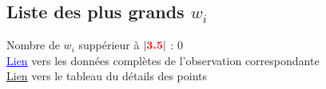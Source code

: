 \documentclass[a4paper, 9pt]{report}
\newenvironment{smalllongtable}{%
    \scriptsize %
    \ttfamily
    \begin{longtable}%
    }{
    \end{longtable}%
    }
\begin{document}
                \newpage
                            \begin{landscape}
                            \subsection{Liste des plus grands $w_i$}
                            \hypertarget{tableau_plusG_wi}{}
                            Nombre de $w_i$ suppérieur à $|\textbf{\textcolor{red}{3.5}}|$ : 0\\
                            \hyperlink{tableau_obs}{\textcolor{blue}{\underline{Lien}}} vers les données complètes de l'observation correspondante\\
                            \hyperlink{tableau_details_points}{Lien} vers le tableau du détails des points\\
                            \vspace{8pt}
                    
                                \begin{smalllongtable}{     
                                >{\raggedright}m{}%
                                >{\raggedright}m{1.5cm}%
                                >{\raggedleft}m{2.4cm}%
                                >{\raggedleft}m{1.2cm}%
                                >{\raggedleft}m{1 cm}%
                                >{\raggedleft}m{2.1cm}%
                                >{\raggedleft}m{1 cm}%
                                >{\raggedleft}m{1cm}%
                                >{\raggedleft}m{1cm}%
                                >{\raggedleft}m{1 cm}%
                                >{\raggedleft}m{1.1cm}%
                                >{\raggedleft}m{1.1cm}%
                                >{\raggedleft}m{1.4cm}%
                                >{\raggedleft\arraybackslash}m{1.5 cm}}%
                    

\end{smalllongtable}
\end{landscape}
\end{document}
